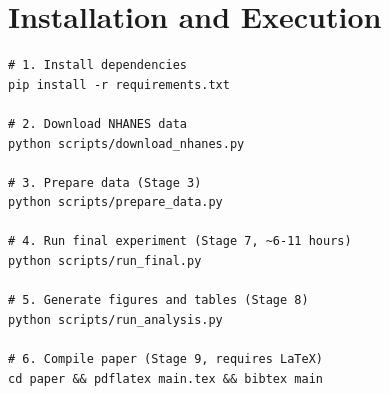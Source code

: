 \documentclass[12pt, a4paper, oneside]{report}
\theoremstyle{definition}
\begin{document}
\section{Installation and Execution}
\begin{lstlisting}
# 1. Install dependencies
pip install -r requirements.txt

# 2. Download NHANES data
python scripts/download_nhanes.py

# 3. Prepare data (Stage 3)
python scripts/prepare_data.py

# 4. Run final experiment (Stage 7, ~6-11 hours)
python scripts/run_final.py

# 5. Generate figures and tables (Stage 8)
python scripts/run_analysis.py

# 6. Compile paper (Stage 9, requires LaTeX)
cd paper && pdflatex main.tex && bibtex main
\end{lstlisting}



\end{document}
